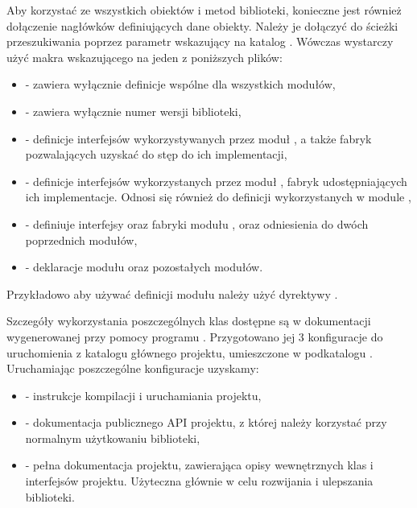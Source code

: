 \documentclass[polish]{standalone}
\begin{document}
Aby korzystać ze wszystkich obiektów i metod biblioteki, konieczne jest również dołączenie nagłówków definiujących
dane obiekty. Należy je dołączyć do ścieżki przeszukiwania poprzez parametr 
wskazujący na katalog . Wówczas wystarczy użyć makra  wskazującego na jeden z poniższych
plików:
\begin{itemize}
\item {} - zawiera wyłącznie definicje wspólne dla wszystkich modułów,
\item {} - zawiera wyłącznie numer wersji biblioteki,
\item {} - definicje interfejsów wykorzystywanych przez moduł , a także fabryk
pozwalających uzyskać do stęp do ich implementacji,
\item {} - definicje interfejsów wykorzystanych przez moduł , fabryk 
udostępniających ich implementacje. Odnosi się również do definicji wykorzystanych w module ,
\item {} - definiuje interfejsy oraz fabryki modułu , oraz odniesienia do dwóch poprzednich
modułów,
\item {} - deklaracje modułu  oraz pozostałych modułów.
\end{itemize}

Przykładowo aby używać definicji modułu  należy użyć dyrektywy .

Szczegóły wykorzystania poszczególnych klas dostępne są w dokumentacji wygenerowanej przy pomocy programu
. Przygotowano jej 3 konfiguracje do uruchomienia z katalogu głównego projektu, umieszczone w podkatalogu
. Uruchamiając poszczególne konfiguracje uzyskamy:
\begin{itemize}
\item {} - instrukcje kompilacji i uruchamiania projektu,
\item {} - dokumentacja publicznego API projektu, z której należy korzystać przy 
normalnym użytkowaniu biblioteki,
\item {} - pełna dokumentacja projektu, zawierająca opisy wewnętrznych klas i 
interfejsów projektu. Użyteczna głównie w celu rozwijania i ulepszania biblioteki.
\end{itemize}
\end{document}

